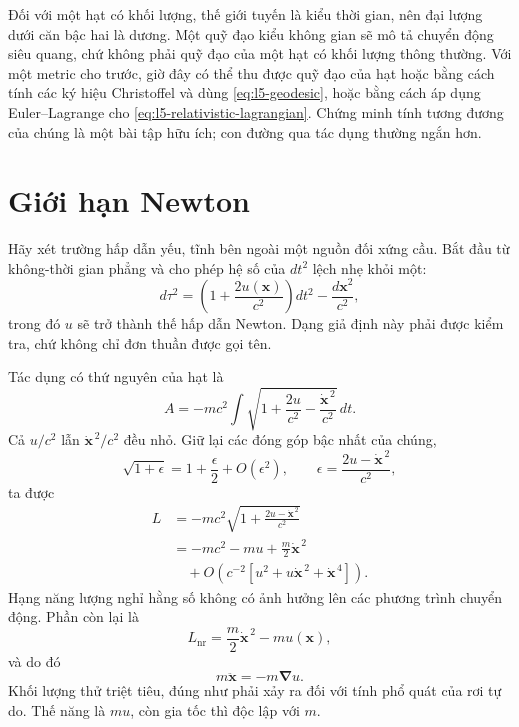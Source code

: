 Đối với một hạt có khối lượng, thế giới tuyến là kiểu thời gian, nên đại lượng dưới căn bậc hai là dương. Một quỹ đạo kiểu không gian sẽ mô tả chuyển động siêu quang, chứ không phải quỹ đạo của một hạt có khối lượng thông thường. Với một metric cho trước, giờ đây có thể thu được quỹ đạo của hạt hoặc bằng cách tính các ký hiệu Christoffel và dùng \eqref{eq:l5-geodesic}, hoặc bằng cách áp dụng Euler--Lagrange cho \eqref{eq:l5-relativistic-lagrangian}. Chứng minh tính tương đương của chúng là một bài tập hữu ích; con đường qua tác dụng thường ngắn hơn.

\section{Giới hạn Newton}

Hãy xét trường hấp dẫn yếu, tĩnh bên ngoài một nguồn đối xứng cầu. Bắt đầu từ không-thời gian phẳng và cho phép hệ số của \(dt^2\) lệch nhẹ khỏi một:
\begin{equation}
d\tau^2
=\left(1+\frac{2u(\mathbf{x})}{c^2}\right)dt^2
-\frac{d\mathbf{x}^2}{c^2},
\label{eq:l5-weak-metric}
\end{equation}
trong đó \(u\) sẽ trở thành thế hấp dẫn Newton. Dạng giả định này phải được kiểm tra, chứ không chỉ đơn thuần được gọi tên.

Tác dụng có thứ nguyên của hạt là
\begin{equation}
A=-mc^2\int
\sqrt{1+\frac{2u}{c^2}
-\frac{\dot{\mathbf{x}}^{\,2}}{c^2}}\,dt.
\label{eq:l5-weak-action}
\end{equation}
Cả \(u/c^2\) lẫn \(\dot{\mathbf{x}}^{\,2}/c^2\) đều nhỏ. Giữ lại các đóng góp bậc nhất của chúng,
\begin{equation}
\sqrt{1+\epsilon}
=1+\frac{\epsilon}{2}+O(\epsilon^2),
\qquad
\epsilon=\frac{2u-\dot{\mathbf{x}}^{\,2}}{c^2},
\end{equation}
ta được
\begin{align}
L
&=-mc^2
\sqrt{1+\frac{2u-\dot{\mathbf{x}}^{\,2}}{c^2}}\\
&=-mc^2-mu+\frac{m}{2}\dot{\mathbf{x}}^{\,2}\\
&\quad+O\!\left(c^{-2}
 [u^2+u\dot{\mathbf{x}}^{\,2}+\dot{\mathbf{x}}^{\,4}]\right).
\label{eq:l5-newton-expansion}
\end{align}
Hạng năng lượng nghỉ hằng số không có ảnh hưởng lên các phương trình chuyển động. Phần còn lại là
\begin{equation}
L_{\mathrm{nr}}
=\frac{m}{2}\dot{\mathbf{x}}^{\,2}-m u(\mathbf{x}),
\label{eq:l5-newton-lagrangian}
\end{equation}
và do đó
\begin{equation}
m\ddot{\mathbf{x}}=-m\boldsymbol{\nabla}u.
\label{eq:l5-newton-equation}
\end{equation}
Khối lượng thử triệt tiêu, đúng như phải xảy ra đối với tính phổ quát của rơi tự do. Thế năng là \(m u\), còn gia tốc thì độc lập với \(m\).

